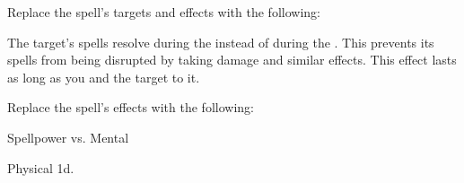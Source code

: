 


Replace the spell's targets and effects with the following:
\begin{spellcontent}

\begin{augmenttargetinginfo}



\end{augmenttargetinginfo}


\begin{augmenteffects}



\spelleffect
The target's spells resolve during the  instead of during the .
This prevents its spells from being disrupted by taking damage and similar effects.
This effect lasts as long as you and the target  to it.








\end{augmenteffects}

\end{spellcontent}








Replace the spell's effects with the following:
\begin{spellcontent}

\begin{augmenteffects}




\begin{spellattack}{Spellpower vs. Mental}


\spellsuccess Physical  \plus1d.


\end{spellattack}





\end{augmenteffects}

\end{spellcontent}





